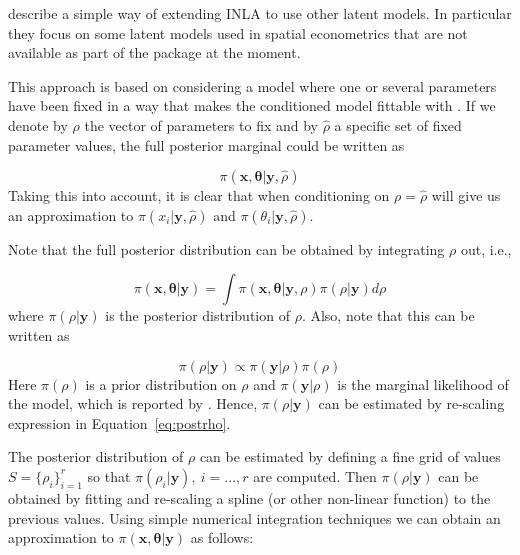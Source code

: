 \documentclass[article]{jss}
\begin{document}
\citet{Bivandetal:2014} describe a simple way of extending INLA to use other
latent models.  In particular they focus on some latent models used in spatial
econometrics that are not available as part of the  package at
the moment.

This approach is based on considering a model where one or several parameters have been
fixed in a way that makes the conditioned model fittable with .  If
we denote by $\rho$ the vector of parameters to fix and by $\hat{\rho}$ a
specific set of fixed parameter values,  the full posterior marginal could be
written as


\begin{equation}
\pi(\mathbf{x}, \mathbf{\theta}|\mathbf{y}, \hat{\rho}) 
\end{equation}
\noindent
Taking this into account,  it is clear that when conditioning on
$\rho=\hat\rho$  will give us an approximation to
$\pi(x_i|\mathbf{y}, \hat{\rho})$ and $\pi(\theta_i|\mathbf{y}, \hat{\rho})$.



Note that the full posterior distribution can be obtained by integrating $\rho$
out, i.e.,

\begin{equation}
\pi(\mathbf{x}, \mathbf{\theta}|\mathbf{y}) = 
\int \pi(\mathbf{x}, \mathbf{\theta}|\mathbf{y}, \rho)\pi(\rho|\mathbf{y})d\rho
\label{eq:fullpost}
\end{equation}
\noindent
where $\pi(\rho|\mathbf{y})$ is the posterior distribution of $\rho$. Also,
note that this can be written as

\begin{equation}
\pi(\rho|\mathbf{y}) \propto \pi(\mathbf{y}|\rho) \pi(\rho)
\label{eq:postrho}
\end{equation}
\noindent
Here $\pi(\rho)$ is a prior distribution on $\rho$ and $\pi(\mathbf{y}|\rho)$
is the marginal likelihood of the model, which is reported by .
Hence, $\pi(\rho|\mathbf{y})$ can be estimated by re-scaling
expression in Equation~\ref{eq:postrho}.


The posterior distribution of $\rho$ can be estimated by defining a fine grid
of values $S=\{\rho_i\}_{i=1}^r$ so that $\pi(\rho_i|\mathbf{y}),\ i=\ldots,r$
are computed.  Then $\pi(\rho|\mathbf{y})$ can be obtained by fitting and
re-scaling a spline (or other non-linear function) to the previous values.
Using simple numerical integration techniques we can obtain an approximation to
$\pi(\mathbf{x}, \mathbf{\theta}|\mathbf{y})$ as follows:
\end{document}
